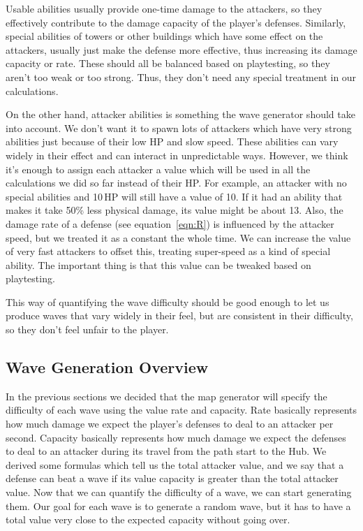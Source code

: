 Usable abilities usually provide one-time damage to the attackers, so they effectively contribute to the damage capacity of the player's defenses.
Similarly, special abilities of towers or other buildings which have some effect on the attackers, usually just make the defense more effective, thus increasing its damage capacity or rate.
These should all be balanced based on playtesting, so they aren't too weak or too strong.
Thus, they don't need any special treatment in our calculations.

On the other hand, attacker abilities is something the wave generator should take into account.
We don't want it to spawn lots of attackers which have very strong abilities just because of their low HP and slow speed.
These abilities can vary widely in their effect and can interact in unpredictable ways.
However, we think it's enough to assign each attacker a value which will be used in all the calculations we did so far instead of their HP.
For example, an attacker with no special abilities and 10\,HP will still have a value of 10.
If it had an ability that makes it take 50\% less physical damage, its value might be about 13.
Also, the damage rate of a defense (see equation~\ref{eqn:R}) is influenced by the attacker speed, but we treated it as a constant the whole time.
We can increase the value of very fast attackers to offset this, treating super-speed as a kind of special ability.
The important thing is that this value can be tweaked based on playtesting.

This way of quantifying the wave difficulty should be good enough to let us produce waves that vary widely in their feel, but are consistent in their difficulty, so they don't feel unfair to the player.

\subsection{Wave Generation Overview}

In the previous sections we decided that the map generator will specify the difficulty of each wave using the value rate and capacity.
Rate basically represents how much damage we expect the player's defenses to deal to an attacker per second.
Capacity basically represents how much damage we expect the defenses to deal to an attacker during its travel from the path start to the Hub.
We derived some formulas which tell us the total attacker value, and we say that a defense can beat a wave if its value capacity is greater than the total attacker value.
Now that we can quantify the difficulty of a wave, we can start generating them.
Our goal for each wave is to generate a random wave, but it has to have a total value very close to the expected capacity without going over.

